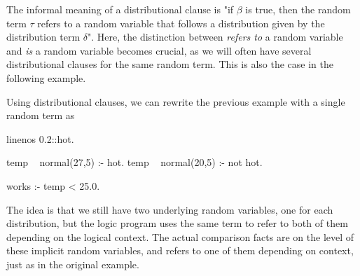 The informal meaning of a distributional clause is "if $\beta$ is true, then the random term $\tau$ refers to a random variable that follows a distribution given by the distribution term $\delta$". Here, the distinction between \emph{refers to} a random variable and \emph{is} a random variable becomes crucial, as we will often have several distributional clauses for the same random term. This is also the case in the following example.
\begin{example}
    Using distributional clauses, we can rewrite the previous example with a single random term  as
    \begin{problog*}{linenos}
0.2::hot.

temp ~ normal(27,5) :- hot.
temp ~ normal(20,5) :- not hot.

works :- temp < 25.0.
    \end{problog*}
    The idea is that we still have two underlying random variables, one for each distribution, but the logic program uses the same term to refer to both of them depending on the logical context. The actual comparison facts are on the level of these implicit random variables, and  refers to one of them depending on context, just as in the original example.
\end{example}


